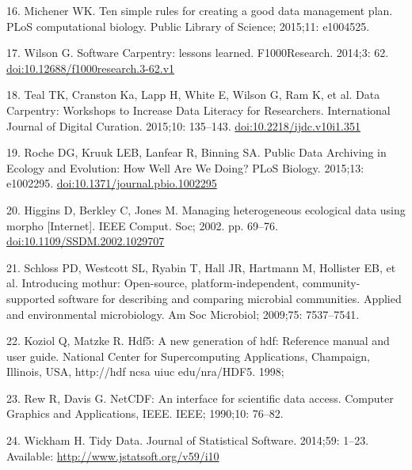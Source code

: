 \documentclass[10pt,letterpaper]{article}
\begin{document}
16. Michener WK. Ten simple rules for creating a good data management
plan. PLoS computational biology. Public Library of Science; 2015;11:
e1004525.

17. Wilson G. Software Carpentry: lessons learned. F1000Research.
2014;3: 62.
\href{http://doi.org/10.12688/f1000research.3-62.v1}{doi:10.12688/f1000research.3-62.v1}

18. Teal TK, Cranston Ka, Lapp H, White E, Wilson G, Ram K, et al. Data
Carpentry: Workshops to Increase Data Literacy for Researchers.
International Journal of Digital Curation. 2015;10: 135--143.
\href{http://doi.org/10.2218/ijdc.v10i1.351}{doi:10.2218/ijdc.v10i1.351}

19. Roche DG, Kruuk LEB, Lanfear R, Binning SA. Public Data Archiving in
Ecology and Evolution: How Well Are We Doing? PLoS Biology. 2015;13:
e1002295.
\href{http://doi.org/10.1371/journal.pbio.1002295}{doi:10.1371/journal.pbio.1002295}

20. Higgins D, Berkley C, Jones M. Managing heterogeneous ecological
data using morpho {[}Internet{]}. IEEE Comput. Soc; 2002. pp. 69--76.
\href{http://doi.org/10.1109/SSDM.2002.1029707}{doi:10.1109/SSDM.2002.1029707}

21. Schloss PD, Westcott SL, Ryabin T, Hall JR, Hartmann M, Hollister
EB, et al. Introducing mothur: Open-source, platform-independent,
community-supported software for describing and comparing microbial
communities. Applied and environmental microbiology. Am Soc Microbiol;
2009;75: 7537--7541.

22. Koziol Q, Matzke R. Hdf5: A new generation of hdf: Reference manual
and user guide. National Center for Supercomputing Applications,
Champaign, Illinois, USA, http://hdf ncsa uiuc edu/nra/HDF5. 1998;

23. Rew R, Davis G. NetCDF: An interface for scientific data access.
Computer Graphics and Applications, IEEE. IEEE; 1990;10: 76--82.

24. Wickham H. Tidy Data. Journal of Statistical Software. 2014;59:
1--23. Available: \url{http://www.jstatsoft.org/v59/i10}
\end{document}
